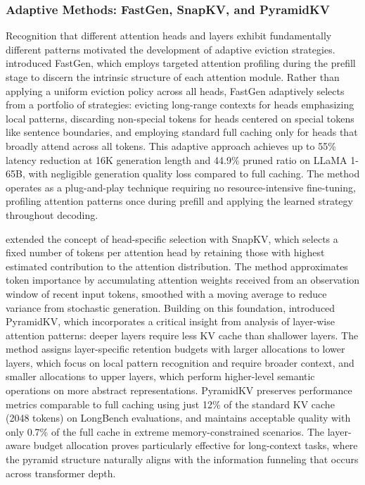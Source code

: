 \documentclass[11pt,letterpaper]{article}
\begin{document}
\subsubsection{Adaptive Methods: FastGen, SnapKV, and PyramidKV}

Recognition that different attention heads and layers exhibit fundamentally different patterns motivated the development of adaptive eviction strategies. \cite{ge2024model} introduced FastGen, which employs targeted attention profiling during the prefill stage to discern the intrinsic structure of each attention module. Rather than applying a uniform eviction policy across all heads, FastGen adaptively selects from a portfolio of strategies: evicting long-range contexts for heads emphasizing local patterns, discarding non-special tokens for heads centered on special tokens like sentence boundaries, and employing standard full caching only for heads that broadly attend across all tokens. This adaptive approach achieves up to 55\% latency reduction at 16K generation length and 44.9\% pruned ratio on LLaMA 1-65B, with negligible generation quality loss compared to full caching. The method operates as a plug-and-play technique requiring no resource-intensive fine-tuning, profiling attention patterns once during prefill and applying the learned strategy throughout decoding.

\cite{li2024snapkv} extended the concept of head-specific selection with SnapKV, which selects a fixed number of tokens per attention head by retaining those with highest estimated contribution to the attention distribution. The method approximates token importance by accumulating attention weights received from an observation window of recent input tokens, smoothed with a moving average to reduce variance from stochastic generation. Building on this foundation, \cite{cai2024pyramidkv} introduced PyramidKV, which incorporates a critical insight from analysis of layer-wise attention patterns: deeper layers require less KV cache than shallower layers. The method assigns layer-specific retention budgets with larger allocations to lower layers, which focus on local pattern recognition and require broader context, and smaller allocations to upper layers, which perform higher-level semantic operations on more abstract representations. PyramidKV preserves performance metrics comparable to full caching using just 12\% of the standard KV cache (2048 tokens) on LongBench evaluations, and maintains acceptable quality with only 0.7\% of the full cache in extreme memory-constrained scenarios. The layer-aware budget allocation proves particularly effective for long-context tasks, where the pyramid structure naturally aligns with the information funneling that occurs across transformer depth.
\end{document}

